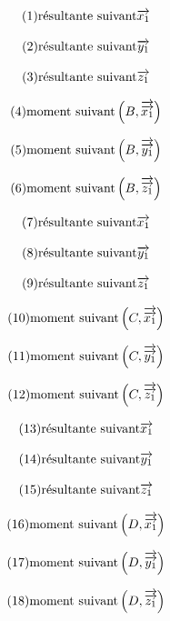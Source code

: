\documentclass[10pt,fleqn]{article} %
\begin{document}
\begin{multicols}{2}
\begin{multicols}{2}
\begin{align*}
\begin{array}{c}
(1) \mbox{résultante suivant} \overrightarrow{x_1} \\ 
\\
(2) \mbox{résultante suivant} \overrightarrow{y_1} \\ 
 \\
(3) \mbox{résultante suivant} \overrightarrow{z_1} \\ 
 \\
(4) \mbox{moment suivant} \left(B,\overrightarrow{\overrightarrow{x_1}}\right) \\ 
 \\
(5) \mbox{moment suivant} \left(B,\overrightarrow{\overrightarrow{y_1}}\right) \\ 
 \\
(6) \mbox{moment suivant} \left(B,\overrightarrow{\overrightarrow{z_1}}\right) \\ 
\\
(7) \mbox{résultante suivant} \overrightarrow{x_1} \\ 
\\
(8) \mbox{résultante suivant} \overrightarrow{y_1} \\ 
 \\
(9) \mbox{résultante suivant} \overrightarrow{z_1} \\ 
 \\
(10) \mbox{moment suivant} \left(C,\overrightarrow{\overrightarrow{x_1}}\right) \\ 
 \\
(11) \mbox{moment suivant} \left(C,\overrightarrow{\overrightarrow{y_1}}\right) \\ 
 \\
(12) \mbox{moment suivant} \left(C,\overrightarrow{\overrightarrow{z_1}}\right) \\ 
\\
(13) \mbox{résultante suivant} \overrightarrow{x_1} \\ 
\\
(14) \mbox{résultante suivant} \overrightarrow{y_1} \\ 
 \\
(15) \mbox{résultante suivant} \overrightarrow{z_1} \\ 
 \\
(16) \mbox{moment suivant} \left(D,\overrightarrow{\overrightarrow{x_1}}\right) \\ 
 \\
(17) \mbox{moment suivant} \left(D,\overrightarrow{\overrightarrow{y_1}}\right) \\ 
 \\
(18) \mbox{moment suivant} \left(D,\overrightarrow{\overrightarrow{z_1}}\right) \\ 

\end{array}
\end{align*}
\end{multicols}
\end{multicols}
\end{document}
